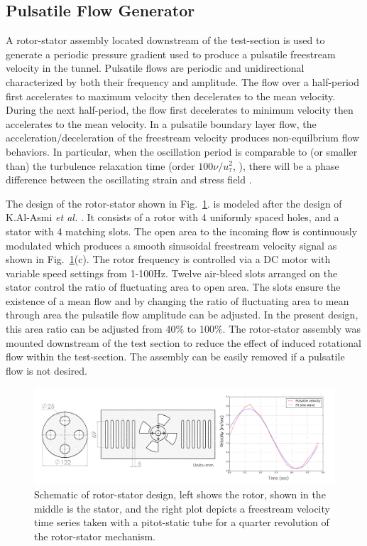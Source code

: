\subsection{Pulsatile Flow Generator}

A rotor-stator assembly located downstream of the test-section is used to generate a periodic pressure gradient used to produce a pulsatile freestream velocity in the tunnel. Pulsatile flows are periodic and unidirectional characterized by both their frequency and amplitude. The flow over a half-period first accelerates to maximum velocity then decelerates to the mean velocity. During the next half-period, the flow first decelerates to minimum velocity then accelerates to the mean velocity.
In a pulsatile boundary layer flow, the acceleration/deceleration of the freestream velocity  produces non-equilbrium flow behaviors. In particular, when the oscillation period is comparable to (or smaller than) the turbulence relaxation time (order $100 \nu / u_\tau^2$, \cite{Peters1993}), there will be a phase difference between the oscillating strain and stress field \cite{Weng2016}. 

The design of the rotor-stator shown in Fig.~\ref{fig:rotor_stator}. is modeled after the design of K.Al-Asmi \textit{et al.} \cite{K.Al-Asmi1993}.
It consists of a rotor with 4 uniformly spaced holes, and a stator with 4 matching slots. The open area to the incoming flow is continuously modulated which produces a smooth sinusoidal freestream velocity signal as shown in Fig.~\ref{fig:rotor_stator}(c). The rotor frequency is controlled via a DC motor with variable speed settings from 1-100Hz. Twelve air-bleed slots arranged on the stator control the ratio of fluctuating area to open area. The slots ensure the existence of a mean flow and by changing the ratio of fluctuating area to mean through area the pulsatile flow amplitude can be adjusted. In the present design, this area ratio can be adjusted from 40$\%$ to 100$\%$. The rotor-stator assembly was mounted downstream of the test section to reduce the effect of induced rotational flow within the test-section. The assembly can be easily removed if a pulsatile flow is not desired.
 
\begin{figure}[h!]
\centering
\includegraphics[scale=0.5]{figures/facility/rotor_stator.png}
\caption{ \footnotesize Schematic of rotor-stator design, left shows the rotor, shown in the middle is the stator, and the right plot depicts a freestream velocity time series taken with a pitot-static tube for a quarter revolution of the rotor-stator mechanism.}
\label{fig:rotor_stator}
\end{figure}

